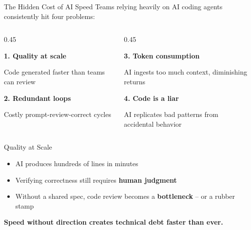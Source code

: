 \documentclass[aspectratio=169]{beamer}
\begin{document}
\begin{frame}{The Hidden Cost of AI Speed}
    Teams relying heavily on AI coding agents consistently hit four problems:

    \vspace{0.5cm}
    \begin{columns}[T]
        \begin{column}{0.45\textwidth}
            \colorbox{utu_pink!20}{\parbox{0.95\textwidth}{\centering\textbf{1. Quality at scale}}}
            \vspace{0.15cm}
            {\small Code generated faster than teams can review}

            \vspace{0.4cm}
            \colorbox{utu_pink!20}{\parbox{0.95\textwidth}{\centering\textbf{2. Redundant loops}}}
            \vspace{0.15cm}
            {\small Costly prompt-review-correct cycles}
        \end{column}
        \begin{column}{0.45\textwidth}
            \colorbox{utu_pink!20}{\parbox{0.95\textwidth}{\centering\textbf{3. Token consumption}}}
            \vspace{0.15cm}
            {\small AI ingests too much context, diminishing returns}

            \vspace{0.4cm}
            \colorbox{utu_pink!20}{\parbox{0.95\textwidth}{\centering\textbf{4. Code is a liar}}}
            \vspace{0.15cm}
            {\small AI replicates bad patterns from accidental behavior}
        \end{column}
    \end{columns}
\end{frame}

\begin{frame}{Quality at Scale}
    \begin{itemize}
        \item AI produces hundreds of lines in minutes
        \item Verifying correctness still requires \textbf{human judgment}
        \item Without a shared spec, code review becomes a \textbf{bottleneck} -- or a rubber stamp
    \end{itemize}

    \vspace{0.5cm}
    \colorbox{utu_pink!20}{\parbox{0.9\textwidth}{
        \centering
        \textbf{Speed without direction creates technical debt faster than ever.}
    }}
\end{frame}
\end{document}
